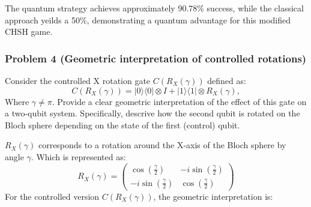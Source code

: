 \documentclass[12pt]{article}
\begin{document}
The quantum strategy achieves approximately 90.78\% success, while the classical approach yeilds a 50\%, demonstrating a quantum advantage for this modified CHSH game.


\subsubsection*{Problem 4 (Geometric interpretation of controlled rotations)}
Consider the controlled X rotation gate $C(R_{X}(\gamma))$ defined as:
\[
C(R_{X}(\gamma)) = |0\rangle \langle0| \otimes I + |1\rangle \langle 1| \otimes R_{X}(\gamma),
\]
Where $\gamma \neq \pi$. Provide a clear geometric interpretation of the effect of this gate on a two-qubit system. Specifically, descrive how the second qubit is rotated on the Bloch sphere depending on the state of the first (control) qubit.

$R_X (\gamma)$ corresponds to a rotation around the X-axis of the Bloch sphere by angle $\gamma$. Which is represented as:
\[
    R_X(\gamma) = \begin{pmatrix} \cos(\frac{\gamma}{2}) & -i\sin(\frac{\gamma}{2}) \\ -i\sin (\frac{\gamma}{2}) & \cos (\frac{\gamma}{2}) \end{pmatrix}
\]
For the controlled version $C(R_X(\gamma))$, the geometric interpretation is:
\end{document}
